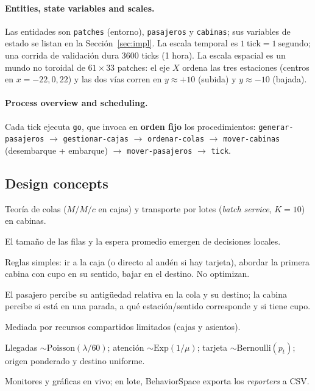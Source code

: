 \documentclass[11pt,a4paper]{article}
\newcommand{\code}[1]{\texttt{#1}}
\begin{document}
\paragraph{Entities, state variables and scales.}
Las entidades son \code{patches} (entorno), \code{pasajeros} y \code{cabinas}; sus
variables de estado se listan en la Sección~\ref{sec:impl}.
La escala temporal es $1\ \text{tick} = 1\ \text{segundo}$; una corrida de
validación dura 3600 ticks (1 hora). La escala espacial es un mundo no toroidal de
$61\times 33$ patches: el eje $X$ ordena las tres estaciones (centros en
$x=-22,0,22$) y las dos vías corren en $y\approx +10$ (subida) y $y\approx -10$
(bajada).

\paragraph{Process overview and scheduling.}
Cada tick ejecuta \code{go}, que invoca en \textbf{orden fijo} los procedimientos:
\code{generar-pasajeros} $\to$ \code{gestionar-cajas} $\to$ \code{ordenar-colas}
$\to$ \code{mover-cabinas} (desembarque + embarque) $\to$ \code{mover-pasajeros}
$\to$ \code{tick}.

\subsection{Design concepts}
\begin{description}[style=unboxed,leftmargin=1.2em,nosep]
  \item[Basic principles.] Teoría de colas ($M/M/c$ en cajas) y transporte por lotes
  (\emph{batch service}, $K=10$) en cabinas.
  \item[Emergence.] El tamaño de las filas y la espera promedio emergen de
  decisiones locales.
  \item[Adaptation.] Reglas simples: ir a la caja (o directo al andén si hay
  tarjeta), abordar la primera cabina con cupo en su sentido, bajar en el destino.
  No optimizan.
  \item[Sensing.] El pasajero percibe su antigüedad relativa en la cola y su
  destino; la cabina percibe si está en una parada, a qué estación/sentido
  corresponde y si tiene cupo.
  \item[Interaction.] Mediada por recursos compartidos limitados (cajas y asientos).
  \item[Stochasticity.] Llegadas $\sim\mathrm{Poisson}(\lambda/60)$; atención
  $\sim\mathrm{Exp}(1/\mu)$; tarjeta $\sim\mathrm{Bernoulli}(p_t)$; origen ponderado
  y destino uniforme.
  \item[Observation.] Monitores y gráficas en vivo; en lote, BehaviorSpace exporta
  los \emph{reporters} a CSV.
\end{description}
\end{document}
